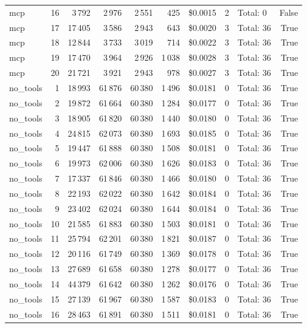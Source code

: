 \documentclass[a4paper,11pt]{article}
\begin{document}
\begin{table}[H]
{\begin{tabular}{l r r r r r r r l r}
mcp & 16 & 3\,792 & 2\,976 & 2\,551 & 425 & \$0.0015 & 2 & Total: 0 & False \\
mcp & 17 & 17\,405 & 3\,586 & 2\,943 & 643 & \$0.0020 & 3 & Total: 36 & True \\
mcp & 18 & 12\,844 & 3\,733 & 3\,019 & 714 & \$0.0022 & 3 & Total: 36 & True \\
mcp & 19 & 17\,470 & 3\,964 & 2\,926 & 1\,038 & \$0.0028 & 3 & Total: 36 & True \\
mcp & 20 & 21\,721 & 3\,921 & 2\,943 & 978 & \$0.0027 & 3 & Total: 36 & True \\
\midrule
no\_tools & 1 & 18\,993 & 61\,876 & 60\,380 & 1\,496 & \$0.0181 & 0 & Total: 36 & True \\
no\_tools & 2 & 19\,872 & 61\,664 & 60\,380 & 1\,284 & \$0.0177 & 0 & Total: 36 & True \\
no\_tools & 3 & 18\,905 & 61\,820 & 60\,380 & 1\,440 & \$0.0180 & 0 & Total: 36 & True \\
no\_tools & 4 & 24\,815 & 62\,073 & 60\,380 & 1\,693 & \$0.0185 & 0 & Total: 36 & True \\
no\_tools & 5 & 19\,447 & 61\,888 & 60\,380 & 1\,508 & \$0.0181 & 0 & Total: 36 & True \\
no\_tools & 6 & 19\,973 & 62\,006 & 60\,380 & 1\,626 & \$0.0183 & 0 & Total: 36 & True \\
no\_tools & 7 & 17\,337 & 61\,846 & 60\,380 & 1\,466 & \$0.0180 & 0 & Total: 36 & True \\
no\_tools & 8 & 22\,193 & 62\,022 & 60\,380 & 1\,642 & \$0.0184 & 0 & Total: 36 & True \\
no\_tools & 9 & 23\,402 & 62\,024 & 60\,380 & 1\,644 & \$0.0184 & 0 & Total: 36 & True \\
no\_tools & 10 & 21\,585 & 61\,883 & 60\,380 & 1\,503 & \$0.0181 & 0 & Total: 36 & True \\
no\_tools & 11 & 25\,794 & 62\,201 & 60\,380 & 1\,821 & \$0.0187 & 0 & Total: 36 & True \\
no\_tools & 12 & 20\,116 & 61\,749 & 60\,380 & 1\,369 & \$0.0178 & 0 & Total: 36 & True \\
no\_tools & 13 & 27\,689 & 61\,658 & 60\,380 & 1\,278 & \$0.0177 & 0 & Total: 36 & True \\
no\_tools & 14 & 44\,379 & 61\,642 & 60\,380 & 1\,262 & \$0.0176 & 0 & Total: 36 & True \\
no\_tools & 15 & 27\,139 & 61\,967 & 60\,380 & 1\,587 & \$0.0183 & 0 & Total: 36 & True \\
no\_tools & 16 & 28\,463 & 61\,891 & 60\,380 & 1\,511 & \$0.0181 & 0 & Total: 36 & True \\

\end{tabular}}
\end{table}
\end{document}
